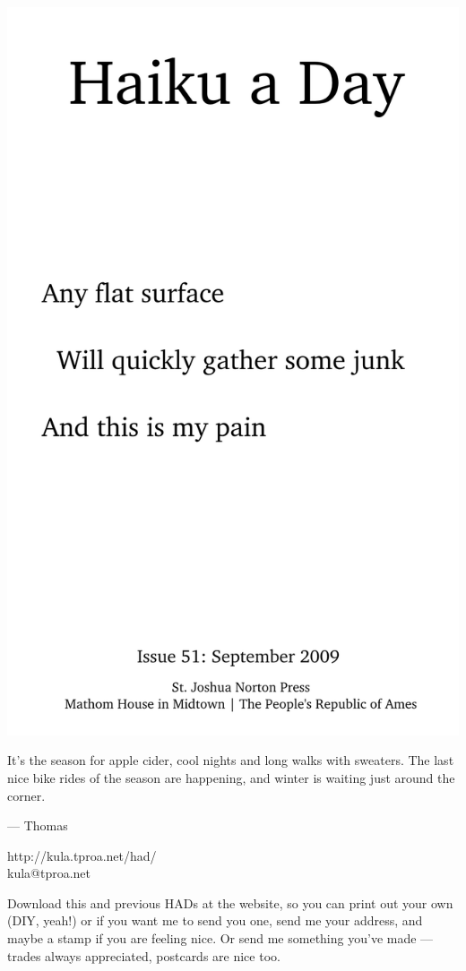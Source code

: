 \documentclass[12pt]{article}
\begin{document}
\includegraphics{frontpage.png}

\newpage


It's the season for apple cider, cool nights and long walks
with sweaters. The last nice bike rides of the season are
happening, and winter is waiting just around the corner.

--- Thomas

http://kula.tproa.net/had/ \\
kula@tproa.net

Download this and previous HADs at the website, so you can
print out your own (DIY, yeah!) or if you want me to send
you one, send me your address, and maybe a stamp if you
are feeling nice. Or send me something you've made ---
trades always appreciated, postcards are nice too.
\end{document}
